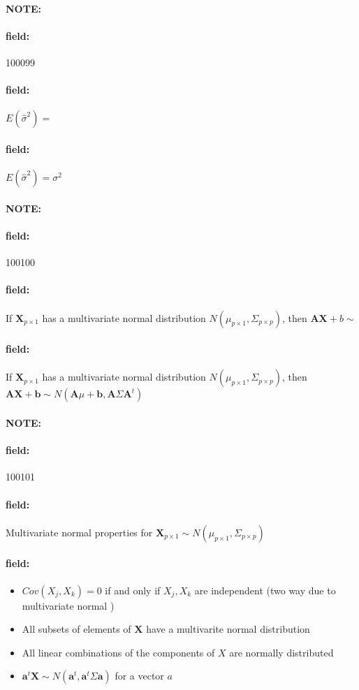 \documentclass[12pt]{article}
\newenvironment{note}{\paragraph{NOTE:}}{}
\newenvironment{field}{\paragraph{field:}}{}
\begin{document}
\begin{note} \begin{field} \tiny 100099 \end{field}
 \begin{field}
  $E(\hat{\sigma}^2) = $
 \end{field}
 \begin{field}
  $E(\hat{\sigma}^2) = \sigma^2$
 \end{field}
\end{note}

\begin{note} \begin{field} \tiny 100100 \end{field}
 \begin{field}
  If $\mathbf{X}_{p \times 1}$ has a multivariate normal distribution $N(\mu_{p\times 1}, \Sigma_{p \times p})$, then $\mathbf{AX} + b \sim $
 \end{field}
 \begin{field}
  If $\mathbf{X}_{p \times 1}$ has a multivariate normal distribution $N(\mu_{p\times 1}, \Sigma_{p \times p})$, then $\mathbf{AX} + \mathbf{b} \sim N(\mathbf{A}\mu + \mathbf{b}, \mathbf{A}\Sigma \mathbf{A}^t)$



 \end{field}
\end{note}

\begin{note} \begin{field} \tiny 100101 \end{field}
 \begin{field}
  Multivariate normal properties for $\mathbf{X}_{p \times 1} \sim N(\mu_{p\times 1}, \Sigma_{p \times p})$
 \end{field}
 \begin{field}
  \begin{itemize}
   \item $Cov(X_j,X_k) = 0$ if and only if $X_j,X_k$ are independent (two way due to multivariate normal )
   \item All subsets of elements of $\mathbf{X}$ have a multivarite normal distribution
   \item All linear combinations of the components of $X$ are normally distributed
   \item $\mathbf{a}^t \mathbf{X} \sim N(\mathbf{a}^t, \mathbf{a}^t \Sigma \mathbf{a})$ for a vector $a$
  \end{itemize}
 \end{field}
\end{note}
\end{document}
